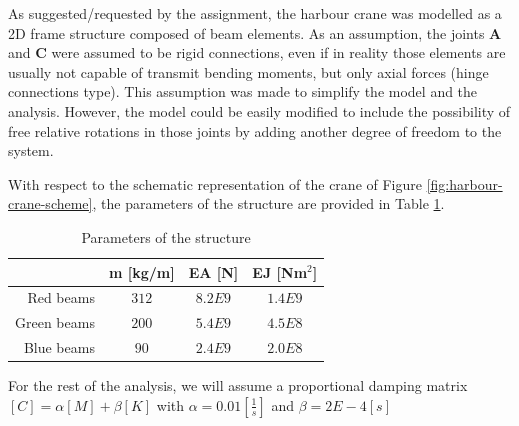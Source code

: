 As suggested/requested by the assignment, the harbour crane was modelled as a 2D frame structure composed of beam elements.
As an assumption, the joints \textbf{A} and \textbf{C} were assumed to be rigid connections, even if in reality those elements are usually not capable of transmit bending moments, but only axial forces (hinge connections type).
This assumption was made to simplify the model and the analysis.
However, the model could be easily modified to include the possibility of free relative rotations in those joints by adding another degree of freedom to the system.

With respect to the schematic representation of the crane of Figure \ref{fig:harbour-crane-scheme}, the parameters of the structure are provided in Table \ref{tab:parameters}.

\begin{table}[H]
    \centering
    \begin{tabular}{|r|c|c|c|}
        \hline
        ~           & \textbf{m [kg/m]} & \textbf{EA [N]} & \textbf{EJ [Nm$^2$]} \\
        \hline
        Red beams   & $312$             & $8.2E9$         & $1.4E9$              \\
        Green beams & $200$             & $5.4E9$         & $4.5E8$              \\
        Blue beams  & $90$              & $2.4E9$         & $2.0E8$              \\
        \hline
    \end{tabular}
    \caption{Parameters of the structure}
    \label{tab:parameters}
\end{table}

For the rest of the analysis, we will assume a proportional damping matrix $[C] = \alpha [M] + \beta [K]$ with $\alpha = 0.01 [\frac{1}{s}]$ and $\beta = 2E-4 [s]$